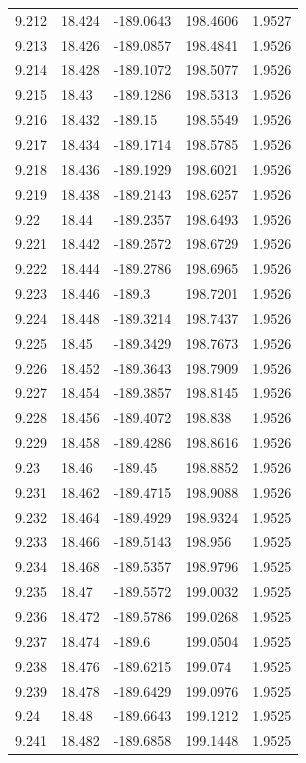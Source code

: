 \begin{tabular}{lllll}
9.212 & 18.424 & -189.0643 & 198.4606 & 1.9527 \\
9.213 & 18.426 & -189.0857 & 198.4841 & 1.9526 \\
9.214 & 18.428 & -189.1072 & 198.5077 & 1.9526 \\
9.215 & 18.43 & -189.1286 & 198.5313 & 1.9526 \\
9.216 & 18.432 & -189.15 & 198.5549 & 1.9526 \\
9.217 & 18.434 & -189.1714 & 198.5785 & 1.9526 \\
9.218 & 18.436 & -189.1929 & 198.6021 & 1.9526 \\
9.219 & 18.438 & -189.2143 & 198.6257 & 1.9526 \\
9.22 & 18.44 & -189.2357 & 198.6493 & 1.9526 \\
9.221 & 18.442 & -189.2572 & 198.6729 & 1.9526 \\
9.222 & 18.444 & -189.2786 & 198.6965 & 1.9526 \\
9.223 & 18.446 & -189.3 & 198.7201 & 1.9526 \\
9.224 & 18.448 & -189.3214 & 198.7437 & 1.9526 \\
9.225 & 18.45 & -189.3429 & 198.7673 & 1.9526 \\
9.226 & 18.452 & -189.3643 & 198.7909 & 1.9526 \\
9.227 & 18.454 & -189.3857 & 198.8145 & 1.9526 \\
9.228 & 18.456 & -189.4072 & 198.838 & 1.9526 \\
9.229 & 18.458 & -189.4286 & 198.8616 & 1.9526 \\
9.23 & 18.46 & -189.45 & 198.8852 & 1.9526 \\
9.231 & 18.462 & -189.4715 & 198.9088 & 1.9526 \\
9.232 & 18.464 & -189.4929 & 198.9324 & 1.9525 \\
9.233 & 18.466 & -189.5143 & 198.956 & 1.9525 \\
9.234 & 18.468 & -189.5357 & 198.9796 & 1.9525 \\
9.235 & 18.47 & -189.5572 & 199.0032 & 1.9525 \\
9.236 & 18.472 & -189.5786 & 199.0268 & 1.9525 \\
9.237 & 18.474 & -189.6 & 199.0504 & 1.9525 \\
9.238 & 18.476 & -189.6215 & 199.074 & 1.9525 \\
9.239 & 18.478 & -189.6429 & 199.0976 & 1.9525 \\
9.24 & 18.48 & -189.6643 & 199.1212 & 1.9525 \\
9.241 & 18.482 & -189.6858 & 199.1448 & 1.9525 \\

\end{tabular}
